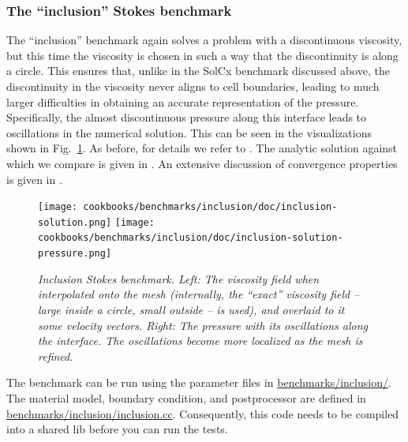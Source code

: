 \documentclass{article}
\begin{document}
\subsubsection{The ``inclusion'' Stokes benchmark}
\label{sec:benchmark-inclusion}

The ``inclusion'' benchmark again solves a problem with a discontinuous
viscosity, but this time the viscosity is chosen in such a way that the
discontinuity is along a circle. This ensures that, unlike in the SolCx
benchmark discussed above, the discontinuity in the viscosity never aligns to
cell boundaries, leading to much larger difficulties in obtaining an accurate
representation of the pressure. Specifically, the almost discontinuous
pressure along this interface leads to oscillations in the numerical
solution. This can be seen in the visualizations shown in
Fig.~\ref{fig:inclusion}. As before, for details we refer to
\cite{DMGT11}. The analytic solution against which we compare is given in
\cite{SP03}. An extensive discussion of convergence properties is given in
\cite{KHB12}.

\begin{figure}
  \begin{center}
    \texttt{[image: cookbooks/benchmarks/inclusion/doc/inclusion-solution.png]}
    \hfill
    \texttt{[image: cookbooks/benchmarks/inclusion/doc/inclusion-solution-pressure.png]}
    \caption{\it Inclusion Stokes benchmark. Left: The viscosity field
      when interpolated onto the mesh (internally, the ``exact'' viscosity
      field -- large inside a circle, small outside -- is used),
      and overlaid to it some velocity vectors. Right: The
      pressure with its oscillations along the interface. The oscillations
      become more localized as the mesh is refined.}
    \label{fig:inclusion}
  \end{center}
\end{figure}

The benchmark can be run using the parameter files in \url{benchmarks/inclusion/}. The material model, boundary condition, and postprocessor are defined in \url{benchmarks/inclusion/inclusion.cc}. Consequently, this code needs to be compiled into a shared lib before you can run the tests.


\end{document}

